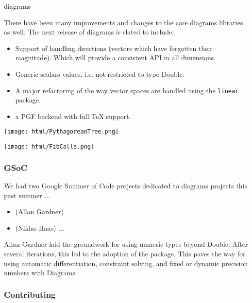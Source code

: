 \begin{hcarentry}[updated]{diagrams}

There have been many improvements and changes to the core
diagrams libraries as well.  The next release of diagrams is
slated to include:
\begin{itemize}
\item Support of handling directions (vectors which have forgotten their magnitude).
  Which will provide a consistent API in all dimensions.
\item Generic scalars values, i.e. not restricted to type 
  Double.
\item A major refactoring of the way vector spaces are handled
  using the \texttt{linear} package.
\item a PGF backend with full TeX support.
\end{itemize}


\begin{center}
\texttt{[image: html/PythagoreanTree.png]}
\end{center}


\begin{center}
\texttt{[image: html/FibCalls.png]}
\end{center}
\subsubsection*{GSoC}

We had two Google Summer of Code projects dedicated to diagrams
projects this past summer ...

\begin{itemize}
\item (Allan Gardner)
\item (Niklas Haas) ...
\end{itemize}

Allan Gardner laid the groundwork for using numeric types beyond
Double.  After several iterations, this led to the adoption of the
 package. This paves the way for using automatic
differentiation, constraint solving, and fixed or dynamic precision
numbers with Diagrams.

\subsubsection*{Contributing}


\end{hcarentry}
